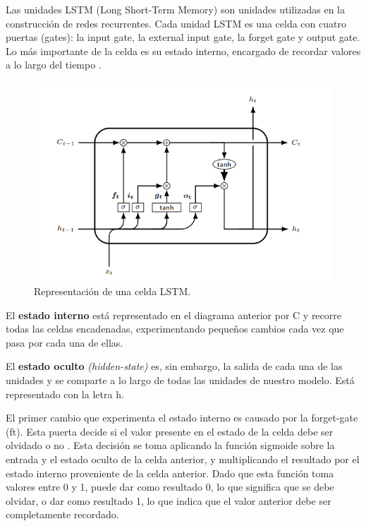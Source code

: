 \vspace{1\baselineskip}
Las unidades LSTM (Long Short-Term Memory) son unidades utilizadas en la construcción de redes recurrentes. Cada unidad LSTM es una celda con cuatro puertas (gates): la input gate, la external input gate, la forget gate y output gate. Lo más importante de la celda es su estado interno, encargado de recordar valores a lo largo del tiempo \cite{roman2018redes}.

\begin{figure}[H]
  \begin{center}
    \includegraphics[scale=0.80]{./arquitectura lstm nuevo.png}
    \caption{Representación de una celda LSTM.}
    \label{fig:lstm_grafico}
  \end{center}
\end{figure}


El \textbf{estado interno} está representado en el diagrama anterior por C y
recorre todas las celdas encadenadas, experimentando pequeños cambios cada vez
que pasa por cada una de ellas.

\vspace{1\baselineskip}
El \textbf{estado oculto} \textit{(hidden-state)} es, sin embargo, la salida de
cada una de las unidades y se comparte a lo largo de todas las unidades de
nuestro modelo. Está representado con la letra h.

\vspace{1\baselineskip}
El primer cambio que experimenta el estado interno es causado por la
forget-gate (ft). Esta puerta decide si el valor presente en el estado de la
celda debe ser olvidado o no \cite{roman2018redes}. Esta decisión se toma
aplicando la función sigmoide sobre la entrada y el estado oculto de la celda
anterior, y multiplicando el resultado por el estado interno proveniente de la
celda anterior. Dado que esta función toma valores entre 0 y 1, puede dar como
resultado 0, lo que significa que se debe olvidar, o dar como resultado 1, lo
que indica que el valor anterior debe ser completamente recordado.

